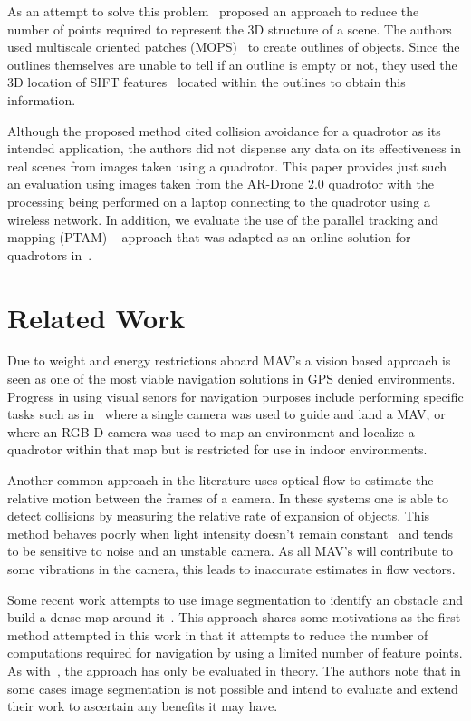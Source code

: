\documentclass{acmsiggraph}
\begin{document}
As an attempt to solve this problem~\cite{lee2011} proposed an approach to reduce the number of points required to 
represent the 3D structure of a scene.  The authors used multiscale oriented patches (MOPS)~\cite{BSW05} to create outlines of 
objects.  Since the outlines themselves are unable to tell if an outline is empty or not, they used the 3D location of SIFT 
features~\cite{lowe2004} located within the outlines to obtain this information.  

Although the proposed method cited collision avoidance for a quadrotor as its intended application, the authors did not 
dispense any data on its effectiveness in real scenes from images taken using a quadrotor.  This paper provides just such an 
evaluation using images taken from the AR-Drone 2.0 quadrotor with the processing being performed on a laptop connecting 
to the quadrotor using a wireless network. In addition, we evaluate the use of the parallel tracking and mapping (PTAM)
~\cite{klein07parallel} approach that was adapted as an online solution for quadrotors in~\cite{weiss2011}.

\section{Related Work}
Due to weight and energy restrictions aboard MAV's a vision based approach is seen as one of the most viable navigation 
solutions in GPS denied environments.  Progress in using visual senors for navigation purposes include performing specific 
tasks such as in~\cite{johnson2005} where a single camera was used to guide and land a MAV, or~\cite{huang2011isrr} where an 
RGB-D camera was used to map an environment and localize a quadrotor within that map but is restricted for use in indoor
environments.

Another common approach in the literature uses optical flow to estimate the relative motion between the frames of a camera.
In these systems one is able to detect collisions by measuring the relative rate of expansion of objects.  This method 
behaves poorly when light intensity doesn't remain constant~\cite{horn1981} and tends to be sensitive to noise and
an unstable camera.  As all MAV's will contribute to some vibrations in the camera, this leads to inaccurate estimates in
flow vectors.

Some recent work attempts to use image segmentation to identify an obstacle and build a dense map around it~\cite{ha2012}.  
This approach shares some motivations as the first method attempted in this work in that it attempts to reduce the number
of computations required for navigation by using a limited number of feature points.  As with~\cite{lee2011}, the approach
has only be evaluated in theory.  The authors note that in some cases image segmentation is not possible and intend to 
evaluate and extend their work to ascertain any benefits it may have.
\end{document}
